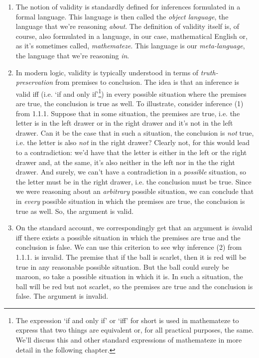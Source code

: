 \begin{enumerate}[\thesection.1]
	\item \label{intro:valid:math2} The notion of validity is standardly defined for inferences formulated in a formal language. This language is then called the \emph{object language}, the language that we're reasoning \emph{about}. The definition of validity itself is, of course, also formulated in a language, in our case, mathematical English or, as it's sometimes called, \emph{mathemateze}. This language is our \emph{meta-language}, the language that we're reasoning \emph{in}. 
	
	\item \label{intro:valid:valid} In modern logic, validity is typically understood in terms of \emph{truth-preservation} from premises to conclusion. The idea is that an inference is valid iff (i.e. `if and only if'\footnote{The expression `if and only if' or `iff' for short is used in mathemateze to express that two things are equivalent or, for all practical purposes, the same. We'll discuss this and other standard expressions of mathemateze in more detail in the following chapter.}) in every possible situation where the premises are true, the conclusion is true as well. To illustrate, consider inference (1) from 1.1.1. Suppose that in some situation, the premises are true, i.e. the letter is in the left drawer or in the right drawer and it's not in the left drawer. Can it be the case that in such a situation, the conclusion is \emph{not} true, i.e. the letter is also \emph{not} in the right drawer? Clearly not, for this would lead to a contradiction: we'd have that the letter is either in the left or the right drawer and, at the same, it's also neither in the left nor in the the right drawer. And surely, we can't have a contradiction in a \emph{possible} situation, so the letter must be in the right drawer, i.e. the conclusion must be true. Since we were reasoning about an \emph{arbitrary} possible situation, we can conclude that in \emph{every} possible situation in which the premises are true, the conclusion is true as well. So, the argument is valid.
	
	\item On the standard account, we correspondingly get that an argument is \emph{in}valid iff there exists a possible situation in which the premises are true and the conclusion is false. We can use this criterion to see why inference (2) from 1.1.1. is invalid. The premise that if the ball is scarlet, then it is red will be true in any reasonable possible situation. But the ball could surely be maroon, so take a possible situation in which it is. In such a situation, the ball will be red but not scarlet, so the premises are true and the conclusion is false. The argument is invalid.
	

\end{enumerate}
